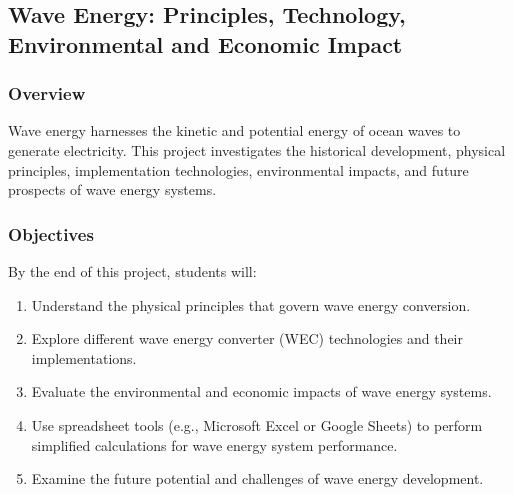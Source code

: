 \documentclass[letterpaper,10pt,english]{jupyterBook}
\begin{document}
\subsection{Wave Energy: Principles, Technology, Environmental and Economic Impact}
\label{\detokenize{ProjectSyllabus:wave-energy-principles-technology-environmental-and-economic-impact}}

\subsubsection{Overview}
\label{\detokenize{ProjectSyllabus:id27}}
\sphinxAtStartPar
Wave energy harnesses the kinetic and potential energy of ocean waves to generate electricity. This project investigates the historical development, physical principles, implementation technologies, environmental impacts, and future prospects of wave energy systems.


\subsubsection{Objectives}
\label{\detokenize{ProjectSyllabus:id28}}
\sphinxAtStartPar
By the end of this project, students will:
\begin{enumerate}
%
\item {} 
\sphinxAtStartPar
Understand the physical principles that govern wave energy conversion.

\item {} 
\sphinxAtStartPar
Explore different wave energy converter (WEC) technologies and their implementations.

\item {} 
\sphinxAtStartPar
Evaluate the environmental and economic impacts of wave energy systems.

\item {} 
\sphinxAtStartPar
Use spreadsheet tools (e.g., Microsoft Excel or Google Sheets) to perform simplified calculations for wave energy system performance.

\item {} 
\sphinxAtStartPar
Examine the future potential and challenges of wave energy development.

\end{enumerate}
\end{document}
